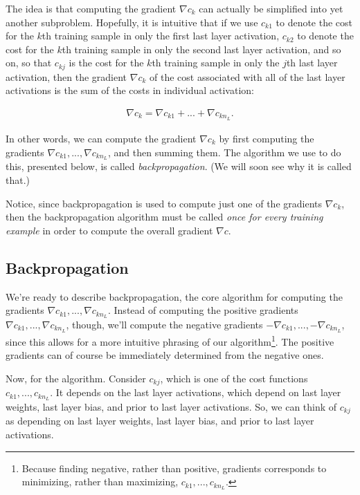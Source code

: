 \documentclass{article}
\begin{document}
	The idea is that computing the gradient $\nabla c_k$ can actually be simplified into yet another subproblem. Hopefully, it is intuitive that if we use $c_{k1}$ to denote the cost for the $k$th training sample in only the first last layer activation, $c_{k2}$ to denote the cost for the $k$th training sample in only the second last layer activation, and so on, so that $c_{kj}$ is the cost for the $k$th training sample in only the $j$th last layer activation, then the gradient $\nabla c_k$ of the cost associated with all of the last layer activations is the sum of the costs in individual activation:
	
	\begin{align*}
		\nabla c_k = \nabla c_{k1} + ... + \nabla c_{kn_L}.
	\end{align*}
	
	In other words, we can compute the gradient $\nabla c_k$ by first computing the gradients $\nabla c_{k1}, ..., \nabla c_{kn_L}$, and then summing them. The algorithm we use to do this, presented below, is called \textit{backpropagation}. (We will soon see why it is called that.)
	
	Notice, since backpropagation is used to compute just one of the gradients $\nabla c_k$, then the backpropagation algorithm must be called \textit{once for every training example} in order to compute the overall gradient $\nabla c$.
	
	\subsection*{Backpropagation}
	
	We're ready to describe backpropagation, the core algorithm for computing the gradients $\nabla c_{k1}, ..., \nabla c_{kn_L}$. Instead of computing the positive gradients $\nabla c_{k1}, ..., \nabla c_{kn_L}$, though, we'll compute the negative gradients $-\nabla c_{k1}, ..., -\nabla c_{kn_L}$, since this allows for a more intuitive phrasing of our algorithm\footnote{Because finding negative, rather than positive, gradients corresponds to minimizing, rather than maximizing, $c_{k1}, ..., c_{kn_L}$.}. The positive gradients can of course be immediately determined from the negative ones.
	
	Now, for the algorithm. Consider $c_{kj}$, which is one of the cost functions $c_{k1}, ..., c_{kn_L}$. It depends on the last layer activations, which depend on last layer weights, last layer bias, and prior to last layer activations. So, we can think of $c_{kj}$ as depending on last layer weights, last layer bias, and prior to last layer activations.
	
\end{document}

